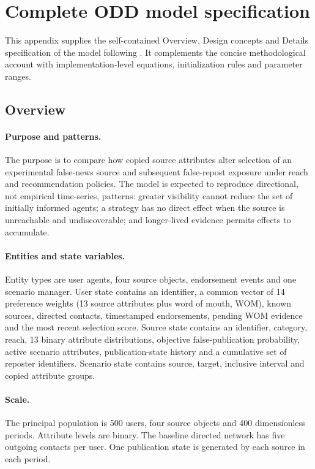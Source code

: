 \section{Complete ODD model specification}
\label{app:odd}

This appendix supplies the self-contained Overview, Design concepts and Details specification of the model following \citet{grimm2020}. It complements the concise methodological account with implementation-level equations, initialization rules and parameter ranges.

\subsection{Overview}

\paragraph{Purpose and patterns.} The purpose is to compare how copied source attributes alter selection of an experimental false-news source and subsequent false-repost exposure under reach and recommendation policies. The model is expected to reproduce directional, not empirical time-series, patterns: greater visibility cannot reduce the set of initially informed agents; a strategy has no direct effect when the source is unreachable and undiscoverable; and longer-lived evidence permits effects to accumulate.

\paragraph{Entities and state variables.} Entity types are user agents, four source objects, endorsement events and one scenario manager. User state contains an identifier, a common vector of 14 preference weights (13 source attributes plus word of mouth, WOM), known sources, directed contacts, timestamped endorsements, pending WOM evidence and the most recent selection score. Source state contains an identifier, category, reach, 13 binary attribute distributions, objective false-publication probability, active scenario attributes, publication-state history and a cumulative set of reposter identifiers. Scenario state contains source, target, inclusive interval and copied attribute groups.

\paragraph{Scale.} The principal population is 500 users, four source objects and 400 dimensionless periods. Attribute levels are binary. The baseline directed network has five outgoing contacts per user. One publication state is generated by each source in each period.

